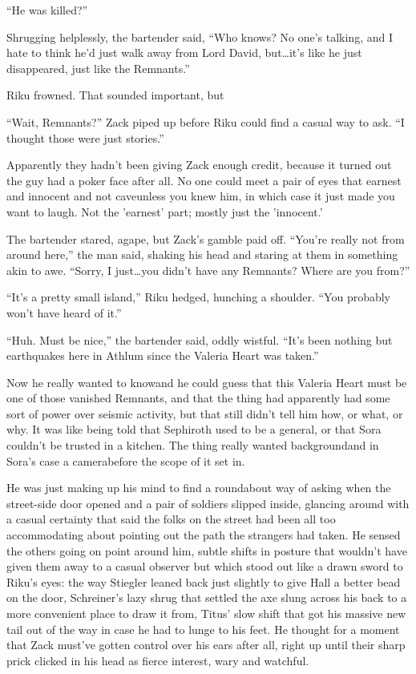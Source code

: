 ``He was killed?''

Shrugging helplessly, the bartender said, ``Who knows? No one's talking, and I hate to think he'd just walk away from Lord David, but\ldots it's like he just disappeared, just like the Remnants.''

Riku frowned. That sounded important, but\textemdash 

``Wait, Remnants?'' Zack piped up before Riku could find a casual way to ask. ``I thought those were just stories.''

Apparently they hadn't been giving Zack enough credit, because it turned out the guy had a poker face after all. No one could meet a pair of eyes that earnest and innocent and not cave\textemdash unless you knew him, in which case it just made you want to laugh. Not the 'earnest' part; mostly just the 'innocent.'

The bartender stared, agape, but Zack's gamble paid off. ``You're really not from around here,'' the man said, shaking his head and staring at them in something akin to awe. ``Sorry, I just\ldots you didn't have any Remnants? Where are you from?''

``It's a pretty small island,'' Riku hedged, hunching a shoulder. ``You probably won't have heard of it.''

``Huh. Must be nice,'' the bartender said, oddly wistful. ``It's been nothing but earthquakes here in Athlum since the Valeria Heart was taken.''

Now he really wanted to know\textemdash and he could guess that this Valeria Heart must be one of those vanished Remnants, and that the thing had apparently had some sort of power over seismic activity, but that still didn't tell him how, or what, or why. It was like being told that Sephiroth used to be a general, or that Sora couldn't be trusted in a kitchen. The thing really wanted background\textemdash and in Sora's case a camera\textemdash before the scope of it set in.

He was just making up his mind to find a roundabout way of asking when the street-side door opened and a pair of soldiers slipped inside, glancing around with a casual certainty that said the folks on the street had been all too accommodating about pointing out the path the strangers had taken. He sensed the others going on point around him, subtle shifts in posture that wouldn't have given them away to a casual observer but which stood out like a drawn sword to Riku's eyes: the way Stiegler leaned back just slightly to give Hall a better bead on the door, Schreiner's lazy shrug that settled the axe slung across his back to a more convenient place to draw it from, Titus' slow shift that got his massive new tail out of the way in case he had to lunge to his feet. He thought for a moment that Zack must've gotten control over his ears after all, right up until their sharp prick clicked in his head as fierce interest, wary and watchful.

